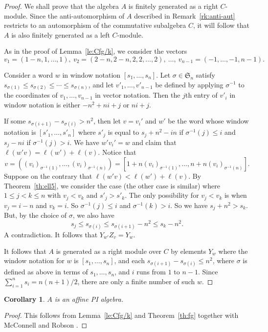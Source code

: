 \documentclass[12pt]{amsart}
\renewcommand{\le}{\leqslant}
\newcommand{\sym}[1]{\mathfrak{S}_{#1}}
\numberwithin{equation}{section}
\newtheorem{corollary}[equation]{Corollary}
\theoremstyle{definition}
\begin{document}
\begin{proof}
We shall prove that the algebra $A$ is finitely generated as a right
$C$-module. Since the anti-auto\-morph\-ism of $A$ described in 
Remark~\ref{rk:anti-aut} restricts to an automorphism of the
commutative subalgebra $C$,  it will follow that $A$ is
also finitely generated as a left $C$-module.

As in the proof of Lemma~\ref{le:Cfg/k}, we consider the vectors
\[ v_1=(1-n,1,\dots,1),\ v_2=(2-n,2-n,2,2,\dots,2),\ \dots,\
v_{n-1}=(-1,\dots,-1,n-1). \]

Consider a word $w$ in window notation $[s_1,\dots,s_n]$. Let
$\sigma\in \sym{n}$ satisfy $s_{\sigma(1)}\le s_{\sigma(2)}\le
\cdots \le s_{\sigma(n)}$, and let $v'_1,\dots,v'_{n-1}$ be defined by
applying $\sigma^{-1}$ to the coordinates of $v_1,\dots,v_{n-1}$ in
vector notation.
Then the $j$th entry of $v'_i$ in window notation is either $-n^2+ni+j$
or $ni+j$. 


If some $s_{\sigma(i+1)}-s_{\sigma(i)}>n^2$, then let $v=v_i'$ and
  $w'$ be the word whose window notation is $[s'_1,\ldots,s'_n]$ where
  $s'_j$ is equal to $s_j+n^2-in$ if $\sigma^{-1}(j)\le i$ and
  $s_j-ni$ if $\sigma^{-1}(j)>i$. We have $w'v_i'=w$ and claim that
  $\ell(w'v)=\ell(w')+\ell(v)$. Notice
  that \[v=((v_i)_{\sigma^{-1}(1)},\ldots,
    (v_i)_{\sigma^{-1}(n)})=[1+n(v_i)_{\sigma^{-1}(1)},\ldots,
    n+n(v_i)_{\sigma^{-1}(n)}].\] Suppose on the contrary that
  $\ell(w'v)<\ell(w')+\ell(v)$. By Theorem~\ref{th:ell5}, we consider
  the case (the other case is similar) where $1\le j<k\le n$ with
  $v_j<v_k$ and $s'_j>s'_k$. The only possibility for  $v_j<v_k$ is
  when $v_j=i-n$ and $v_k=i$. So $\sigma^{-1}(j)\le i$ and
  $\sigma^{-1}(k)> i$. So we have $s_j+n^2>s_k$. But, by the choice of
  $\sigma$, we also have \[s_j\le s_{\sigma(i)}\le
    s_{\sigma(i+1)}-n^2\le s_k-n^2.\] A contradiction. It follows that
  $Y_{w'}Z_v=Y_w$.


It follows that $A$ is generated as a right module over $C$ by elements
$Y_w$ where the window notation for $w$ is $[s_1,\dots,s_n]$, and
each $s_{\sigma(i+1)}-s_{\sigma(i)}\le n^2$, where $\sigma$ is defined
as above in terms of $s_1,\dots,s_n$, and $i$ runs from $1$ to $n-1$.
 Since $\sum_{i=1}^n s_i=n(n+1)/2$, there are only a finite number of
such $w$.
\end{proof}

\begin{corollary}\label{co:PI}
$A$ is an affine PI algebra.
\end{corollary}
\begin{proof}
This follows from Lemma~\ref{le:Cfg/k} and 
Theorem~\ref{th:fg} together with McConnell and
Robson \cite[Corollary~13.1.13]{McConnell/Robson:2001a}. 
\end{proof}
\end{document}
